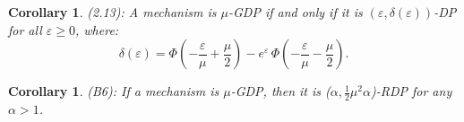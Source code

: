 \documentclass{article}
\theoremstyle{plain}
\newtheorem{corollary}[theorem]{Corollary}
\theoremstyle{definition}
\theoremstyle{remark}
\begin{document}
\begin{corollary}
    (2.13): A mechanism is $\mu$-GDP if and only if it is $(\varepsilon,\delta(\varepsilon))$-DP for all $\varepsilon \ge 0$, where:
\begin{equation}
\delta(\varepsilon)
= \Phi\!\left(-\frac{\varepsilon}{\mu} + \frac{\mu}{2}\right)
- e^{\varepsilon}\,\Phi\!\left(-\frac{\varepsilon}{\mu} - \frac{\mu}{2}\right).
\end{equation}
\end{corollary}

\begin{corollary}
    (B6): If a mechanism is $\mu$-GDP, then it is ($\alpha, \frac{1}{2}\mu^2\alpha $)-RDP for any $\alpha >1$.
\end{corollary}


\end{document}
